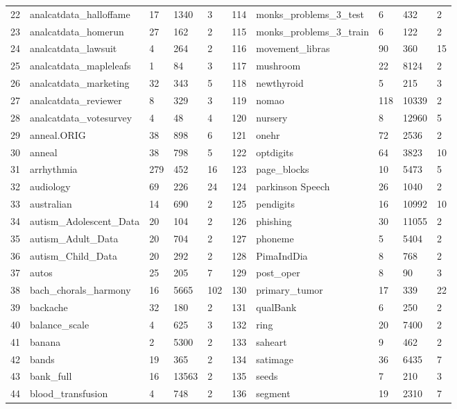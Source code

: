 \documentclass[review,3p]{elsarticle}
\begin{document}
\begin{longtable}{p{0.1cm}lp{0.8cm}<{\centering}p{0.8cm}<{\centering}p{0.9cm}<{\centering}|p{0.1cm}lp{0.8cm}<{\centering}p{0.8cm}<{\centering}p{0.9cm}<{\centering}}
			22	&	analcatdata\_halloffame	&	17	&	1340	&	3	&	114	&	monks\_problems\_3\_test	&	6	&	432	&	2	\\
			23	&	analcatdata\_homerun	&	27	&	162	&	2	&	115	&	monks\_problems\_3\_train	&	6	&	122	&	2	\\
			24	&	analcatdata\_lawsuit	&	4	&	264	&	2	&	116	&	movement\_libras	&	90	&	360	&	15	\\
			25	&	analcatdata\_mapleleafs	&	1	&	84	&	3	&	117	&	mushroom	&	22	&	8124	&	2	\\
			26	&	analcatdata\_marketing	&	32	&	343	&	5	&	118	&	newthyroid	&	5	&	215	&	3	\\
			27	&	analcatdata\_reviewer	&	8	&	329	&	3	&	119	&	nomao	&	118	&	10339	&	2	\\
			28	&	analcatdata\_votesurvey	&	4	&	48	&	4	&	120	&	nursery	&	8	&	12960	&	5	\\
			29	&	anneal.ORIG	&	38	&	898	&	6	&	121	&	onehr	&	72	&	2536	&	2	\\
			30	&	anneal	&	38	&	798	&	5	&	122	&	optdigits	&	64	&	3823	&	10	\\
			31	&	arrhythmia	&	279	&	452	&	16	&	123	&	page\_blocks	&	10	&	5473	&	5	\\
			32	&	audiology	&	69	&	226	&	24	&	124	&	parkinson Speech	&	26	&	1040	&	2	\\
			33	&	australian	&	14	&	690	&	2	&	125	&	pendigits	&	16	&	10992	&	10	\\
			34	&	autism\_Adolescent\_Data	&	20	&	104	&	2	&	126	&	phishing	&	30	&	11055	&	2	\\
			35	&	autism\_Adult\_Data	&	20	&	704	&	2	&	127	&	phoneme	&	5	&	5404	&	2	\\
			36	&	autism\_Child\_Data	&	20	&	292	&	2	&	128	&	PimaIndDia	&	8	&	768	&	2	\\
			37	&	autos	&	25	&	205	&	7	&	129	&	post\_oper	&	8	&	90	&	3	\\
			38	&	bach\_chorals\_harmony	&	16	&	5665	&	102	&	130	&	primary\_tumor	&	17	&	339	&	22	\\
			39	&	backache	&	32	&	180	&	2	&	131	&	qualBank	&	6	&	250	&	2	\\
			40	&	balance\_scale	&	4	&	625	&	3	&	132	&	ring	&	20	&	7400	&	2	\\
			41	&	banana	&	2	&	5300	&	2	&	133	&	saheart	&	9	&	462	&	2	\\
			42	&	bands	&	19	&	365	&	2	&	134	&	satimage	&	36	&	6435	&	7	\\
			43	&	bank\_full	&	16	&	13563	&	2	&	135	&	seeds	&	7	&	210	&	3	\\
			44	&	blood\_transfusion	&	4	&	748	&	2	&	136	&	segment	&	19	&	2310	&	7	\\

\end{longtable}
\end{document}

